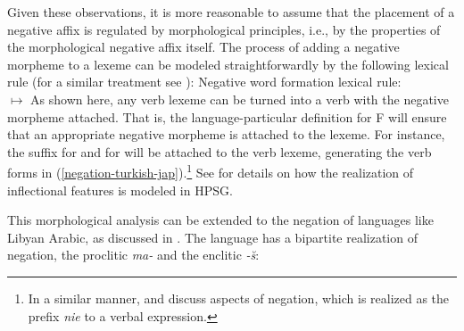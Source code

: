 \documentclass[output=paper
 	        ,biblatex
                ,babelshorthands
                ,newtxmath
                ,draftmode
                ,colorlinks, citecolor=brown
]{langscibook}
\begin{document}
\begin{exe}
\begin{xlist}
\begin{exe}
\begin{xlist}
Given these observations, it is more reasonable to assume that the placement of a
negative affix is regulated by morphological principles, i.e., by
the properties of the morphological negative affix itself.
The process of adding a negative morpheme to a lexeme can be modeled
straightforwardly by the following lexical rule (for a similar treatment see \cites[36]{Kim:00}[111--112]{Crowgey:12}):
\ea
\label{lr-neg-word-formation}
Negative word formation lexical rule:\\
 $\mapsto$
\avm{
[\type*{neg-v-lxm}
 phon < \normalfont !f$_{\mathit{neg}}$(\1)! >\\
 synsem|loc [ cat|head|pol \type{neg}\\
              cont [ \type*{neg-rel}
                     arg1 & \2 ]~~~~~]]
}
\z
%
%
As shown here, any verb lexeme can be turned into a verb with the negative
morpheme attached. That is, the language-particular definition for
F will ensure that an appropriate
negative morpheme is attached to the lexeme. For instance, the
suffix  for  and  for  will be attached to the verb
lexeme, generating the verb forms in (\ref{negation-turkish-jap}).\footnote{In a similar
manner, \citet{PK:99} and \citet{Prz:00, Prz:01}
discuss aspects of  negation, which is realized as the prefix
  \emph{nie} to a verbal expression.} See  for details on how the
realization of inflectional features is modeled in HPSG.

This morphological analysis can be extended to the negation of languages
like Libyan Arabic, as discussed in \citet{BK:12}. The language
has a bipartite realization of negation, the proclitic \emph{ma-} and the enclitic \emph{-\u{s}}:


\end{xlist}
\end{exe}
\end{xlist}
\end{exe}
\end{document}
